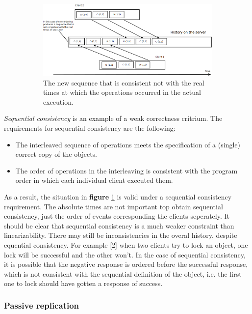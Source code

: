 \begin{figure}[h]
\begin{subfigure}[t]{0.3\textwidth}
                                        \includegraphics[width=\textwidth]{img/systems-and-architectures/linearizability_3}
                                        \caption{The new sequence that is consistent not with the real times at which the operations occurred in the actual execution.}
                                        \label{figure:linearizability:c}
        \end{subfigure}
        \caption{}
        \label{figure:linearizability}
\end{figure}


\emph{Sequential consistency} is an example of a weak correctness critrium. The requirements for sequential consistency are the following:
\begin{itemize}
	\item The interleaved sequence of operations meets the specification of a (single) correct copy of the objects.
	\item The order of operations in the interleaving is consistent with the program order in which each individual client executed them.
\end{itemize}
As a result, the situation in \textbf{figure} \ref{figure:linearizability:c} is valid under a sequential consistency requirement. The absolute times are not important top obtain sequential consistency, just the order of events corresponding the clients seperately. It should be clear that sequential consistency is a much weaker constraint than linearizability. There may still be inconsistencies in the overal history, despite equential consistency. For example [2] when two clients try to lock an object, one lock will be successful and the other won't. In the case of sequential consistency, it is possible that the negative response is ordered before the successful response, which is not consistent with the sequential definition of the object, i.e. the first one to lock should have gotten a response of success.


\subsubsection{Passive replication}


